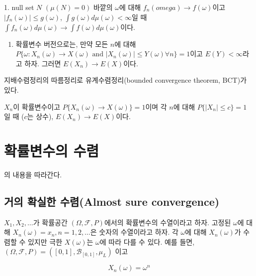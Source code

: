 \documentclass[b5paper,]{scrbook}
\providecommand{\tightlist}{%
  \setlength{\itemsep}{0pt}\setlength{\parskip}{0pt}}
\theoremstyle{plain}
\theoremstyle{definition}
\numberwithin{equation}{section}
\let\BeginKnitrBlock\begin \let\EndKnitrBlock\end
\begin{document}
\BeginKnitrBlock{theorem}[지배수렴정리(DCT)]
\protect\hypertarget{thm:unnamed-chunk-77}{}{\label{thm:unnamed-chunk-77}
{} } 1. null set \(N\) \((\mu(N)=0)\)
바깥의 \(\omega\)에 대해 \(f_{n}(omega) \rightarrow f(\omega)\)이고
\(|f_{n}(\omega) | \leq g(\omega)\),
\(\int g(\omega)d\mu(\omega) < \infty\)일 때
\(\int f_{n}(\omega)d\mu(\omega) \rightarrow \int f(\omega)d\mu(\omega)\)이다.

\begin{enumerate}
\def\labelenumi{\arabic{enumi}.}
\setcounter{enumi}{1}
\tightlist
\item
  확률변수 버전으로는, 만약 모든 \(n\)에 대해
  \(P\{\omega: X_{n}(\omega)\rightarrow X(\omega) \text{ and } |X_{n}(\omega)|\leq Y(\omega) \forall n\}=1\)이고
  \(E(Y)<\infty\)라고 하자. 그러면 \(E(X_{n})\rightarrow E(X)\)이다.
\end{enumerate}
\EndKnitrBlock{theorem}

지배수렴정리의 따름정리로 유계수렴정리(bounded convergence theorem,
BCT)가 있다.

\BeginKnitrBlock{theorem}[지배수렴정리(DCT)]
\protect\hypertarget{thm:unnamed-chunk-78}{}{\label{thm:unnamed-chunk-78}
{} }\(X_{n}\)이 확률변수이고
\(P\{X_{n}(\omega)\rightarrow X(\omega)\}=1\)이며 각 \(n\)에 대해
\(P\{|X_{n}|\leq c\}=1\) 일 때 (\(c\)는 상수),
\(E(X_{n})\rightarrow E(X)\)이다.
\EndKnitrBlock{theorem}

\chapter{확률변수의 수렴}\label{convergencerv}

\citep{Proschan2016}의 내용을 따라간다.

\section{거의 확실한 수렴(Almost sure
convergence)}\label{--almost-sure-convergence}

\(X_{1}, X_{2},\ldots\)가 확률공간 \((\Omega, \mathcal{F}, P)\)에서의
확률변수의 수열이라고 하자. 고정된 \(\omega\)에 대해
\(X_{n}(\omega)=x_{n}, n=1,2,\ldots\)은 숫자의 수열이라고 하자. 각
\(\omega\)에 대해 \(X_{n}(\omega)\)가 수렴할 수 있지만 극한
\(X(\omega)\)는 \(\omega\)에 따라 다를 수 있다. 예를 들면,
\((\Omega, \mathcal{F}, P)=([0,1],\mathcal{B}_{[0,1]},\mu_{L})\) 이고

\begin{equation}
X_{n}(\omega)=\omega^{n}
\label{eq:almostsureex01}
\end{equation}
\end{document}
